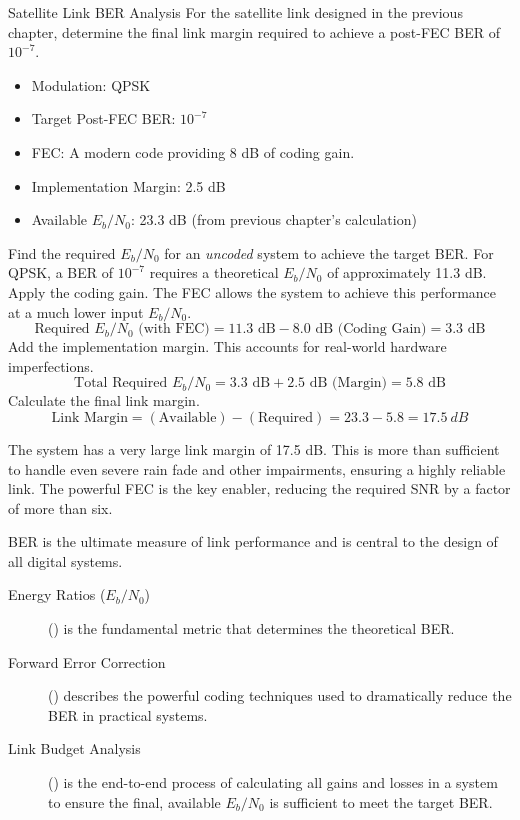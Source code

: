 \begin{workedexample}{Satellite Link BER Analysis}
     For the satellite link designed in the previous chapter, determine the final link margin required to achieve a post-FEC BER of $10^{-7}$.
    \begin{itemize}
        \item Modulation: QPSK
        \item Target Post-FEC BER: $10^{-7}$
        \item FEC: A modern code providing 8 dB of coding gain.
        \item Implementation Margin: 2.5 dB
        \item Available $E_b/N_0$: 23.3 dB (from previous chapter's calculation)
    \end{itemize}
    \begin{derivationsteps}
        \step Find the required $E_b/N_0$ for an \emph{uncoded} system to achieve the target BER. For QPSK, a BER of $10^{-7}$ requires a theoretical $E_b/N_0$ of approximately 11.3 dB.
        \step Apply the coding gain. The FEC allows the system to achieve this performance at a much lower input $E_b/N_0$.
        \[ \text{Required } E_b/N_0 \text{ (with FEC)} = 11.3 \text{ dB} - 8.0 \text{ dB (Coding Gain)} = 3.3 \text{ dB} \]
        \step Add the implementation margin. This accounts for real-world hardware imperfections.
        \[ \text{Total Required } E_b/N_0 = 3.3 \text{ dB} + 2.5 \text{ dB (Margin)} = 5.8 \text{ dB} \]
        \step Calculate the final link margin.
        \[ \text{Link Margin} = (\text{Available}) - (\text{Required}) = 23.3 - 5.8 = \qty{17.5}{dB} \]
    \end{derivationsteps}
     The system has a very large link margin of 17.5 dB. This is more than sufficient to handle even severe rain fade and other impairments, ensuring a highly reliable link. The powerful FEC is the key enabler, reducing the required SNR by a factor of more than six.
\end{workedexample}


\begin{importantbox}[title={Further Reading}]
    BER is the ultimate measure of link performance and is central to the design of all digital systems.
    \begin{description}
        \item[Energy Ratios ($E_b/N_0$)] () is the fundamental metric that determines the theoretical BER.
        \item[Forward Error Correction] () describes the powerful coding techniques used to dramatically reduce the BER in practical systems.
        \item[Link Budget Analysis] () is the end-to-end process of calculating all gains and losses in a system to ensure the final, available $E_b/N_0$ is sufficient to meet the target BER.
    \end{description}
\end{importantbox}
